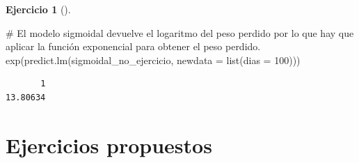 \documentclass[
  a4paper,
]{scrreport}
\newenvironment{Shaded}{\begin{snugshade}}{\end{snugshade}}
\newcommand{\AttributeTok}[1]{\textcolor[rgb]{0.40,0.45,0.13}{#1}}
\newcommand{\CommentTok}[1]{\textcolor[rgb]{0.37,0.37,0.37}{#1}}
\newcommand{\DecValTok}[1]{\textcolor[rgb]{0.68,0.00,0.00}{#1}}
\newcommand{\FunctionTok}[1]{\textcolor[rgb]{0.28,0.35,0.67}{#1}}
\newcommand{\NormalTok}[1]{\textcolor[rgb]{0.00,0.23,0.31}{#1}}
\theoremstyle{definition}
\newtheorem{exercise}{Ejercicio}[chapter]
\theoremstyle{remark}
\begin{document}
\begin{exercise}[]
\begin{enumerate}
\begin{tcolorbox}
\begin{Shaded}
\begin{Highlighting}[]
\CommentTok{\# El modelo sigmoidal devuelve el logaritmo del peso perdido por lo que hay que aplicar la función exponencial para obtener el peso perdido.}
\FunctionTok{exp}\NormalTok{(}\FunctionTok{predict.lm}\NormalTok{(sigmoidal\_no\_ejercicio, }\AttributeTok{newdata =} \FunctionTok{list}\NormalTok{(}\AttributeTok{dias =} \DecValTok{100}\NormalTok{)))}
\end{Highlighting}
\end{Shaded}

\begin{verbatim}
       1 
13.80634 
\end{verbatim}

  \end{tcolorbox}
\end{enumerate}

\end{exercise}

\section{Ejercicios propuestos}\label{ejercicios-propuestos-4}
\end{document}
